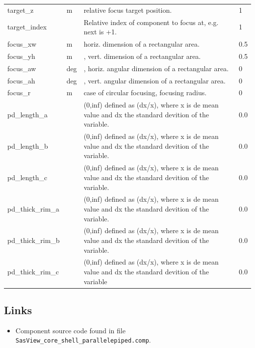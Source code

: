 \begin{longtable}{p{}p{}p{}p{}}
target\_z & m & relative focus target position. & 1 \\
target\_index &   & Relative index of component to focus at, e.g. next is +1. & 1 \\
focus\_xw & m & horiz. dimension of a rectangular area. & 0.5 \\
focus\_yh & m & , vert. dimension of a rectangular area. & 0.5 \\
focus\_aw & deg & , horiz. angular dimension of a rectangular area. & 0 \\
focus\_ah & deg & , vert. angular dimension of a rectangular area. & 0 \\
focus\_r & m & case of circular focusing, focusing radius. & 0 \\
pd\_length\_a &  & (0,inf) defined as (dx/x), where x is de mean value and dx the standard devition of the variable. & 0.0 \\
pd\_length\_b &  & (0,inf) defined as (dx/x), where x is de mean value and dx the standard devition of the variable. & 0.0 \\
pd\_length\_c &  & (0,inf) defined as (dx/x), where x is de mean value and dx the standard devition of the variable. & 0.0 \\
pd\_thick\_rim\_a &  & (0,inf) defined as (dx/x), where x is de mean value and dx the standard devition of the variable. & 0.0 \\
pd\_thick\_rim\_b &  & (0,inf) defined as (dx/x), where x is de mean value and dx the standard devition of the variable. & 0.0 \\
pd\_thick\_rim\_c &  & (0,inf) defined as (dx/x), where x is de mean value and dx the standard devition of the variable & 0.0 \\
\bottomrule
\end{longtable}

\subsection*{Links}
\begin{itemize}
  \item Component source code found in file \texttt{SasView\_core\_shell\_parallelepiped.comp}.
\end{itemize}
